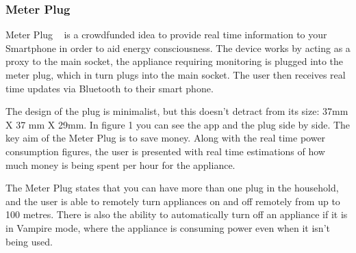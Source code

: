 \documentclass[draft,preprint,12pt,3p]{elsarticle}
\begin{document}
\subsubsection{Meter Plug}

Meter Plug ~\cite{mplug} is a crowdfunded idea to provide real time information to your Smartphone in order to aid energy consciousness. The device works by acting as a proxy to the main socket, the appliance requiring monitoring is plugged into the meter plug, which in turn plugs into the main socket. The user then receives real time updates via Bluetooth to their smart phone.

The design of the plug is minimalist, but this doesn't detract from its size: 37mm X 37 mm X 29mm. In figure 1 you can see the app and the plug side by side. The key aim of the Meter Plug is to save money. Along with the real time power consumption figures, the user is presented with real time estimations of how much money is being spent per hour for the appliance. 

The Meter Plug states that you can have more than one plug in the household, and the user is able to remotely turn appliances on and off remotely from up to 100 metres. There is also the ability to automatically turn off an appliance if it is in Vampire mode, where the appliance is consuming power even when it isn't being used.
\end{document}
